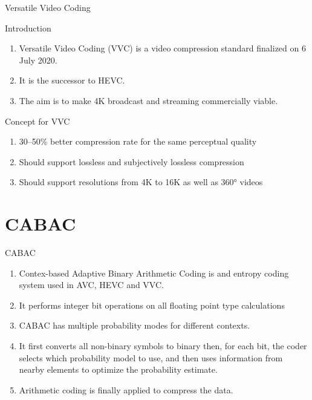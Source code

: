 \documentclass{beamer}
\begin{document}
\begin{frame}{Versatile Video Coding}
\begin{block}{Introduction}
\begin{enumerate}[]
  \item Versatile Video Coding (VVC) is a video compression standard finalized on 6 July 2020.
  \item It is the successor to HEVC. 
  \item The aim is to make 4K broadcast and streaming commercially viable.
\end{enumerate}
\end{block}
\begin{block}{Concept for VVC} 
\begin{enumerate}[]
    \item 30–50\% better compression rate for the same perceptual quality
    \item  Should support lossless and subjectively lossless compression
    \item Should support resolutions from 4K to 16K as well as 360° videos
\end{enumerate}
\end{block}

\end{frame}
\section{CABAC}
\begin{frame}{CABAC}
\begin{enumerate}[]
    \item Contex-based Adaptive Binary Arithmetic Coding is and entropy coding system used in AVC, HEVC and VVC.\\
    \item It performs integer bit operations on all floating point type calculations\\
    \item CABAC has multiple probability modes for different contexts. 
    \item It first converts all non-binary symbols to binary then, for each bit, the coder selects which probability model to use, and then uses information from nearby elements to optimize the probability estimate. 
    \item Arithmetic coding is finally applied to compress the data.
\end{enumerate}

\end{frame}
\end{document}
